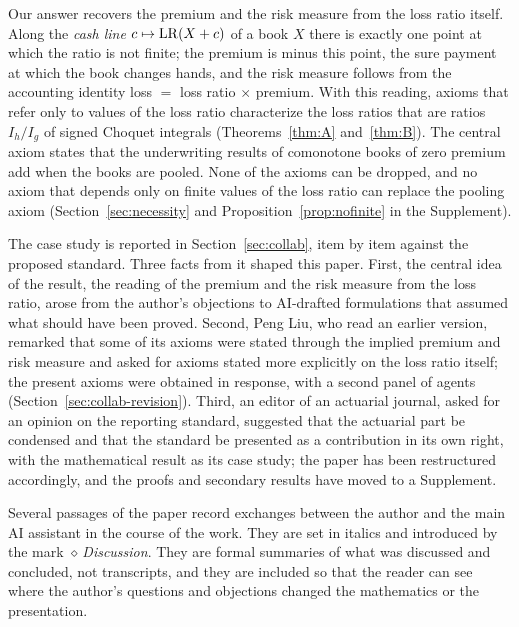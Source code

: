 Our answer recovers the premium and the risk measure from the loss ratio itself. Along the \emph{cash line}
$c\mapsto\mathrm{LR}(X+c)$ of a book $X$ there is exactly one point at which the ratio is not finite; the premium is minus
this point, the sure payment at which the book changes hands, and the risk measure follows from the accounting
identity loss $=$ loss ratio $\times$ premium. With this reading, axioms that refer only to values of the loss ratio
characterize the loss ratios that are ratios $I_h/I_g$ of signed Choquet integrals (Theorems~\ref{thm:A}
and~\ref{thm:B}). The central axiom states that the underwriting results of comonotone books of zero premium add
when the books are pooled. None of the axioms can be dropped, and no axiom that depends only on finite values of the
loss ratio can replace the pooling axiom (Section~\ref{sec:necessity} and Proposition~\ref{prop:nofinite} in the Supplement).

The case study is reported in Section~\ref{sec:collab}, item by item against the proposed standard. Three facts
from it shaped this paper. First, the central idea of the result, the reading of the premium and the risk measure
from the loss ratio, arose from the author's objections to AI-drafted formulations that assumed what should have
been proved. Second, Peng Liu, who read an earlier version, remarked that some of its axioms were stated through the
implied premium and risk measure and asked for axioms stated more explicitly on the loss ratio itself; the present
axioms were obtained in response, with a second panel of agents (Section~\ref{sec:collab-revision}). Third, an
editor of an actuarial journal, asked for an opinion on the reporting standard, suggested that the actuarial part
be condensed and that the standard be presented as a contribution in its own right, with the mathematical result as
its case study; the paper has been restructured accordingly, and the proofs and secondary results have moved to a
Supplement.

Several passages of the paper record exchanges between the author and the main AI assistant in the course of the
work. They are set in italics and introduced by the mark $\diamond$\,\emph{Discussion}. They are formal summaries
of what was discussed and concluded, not transcripts, and they are included so that the reader can see where the
author's questions and objections changed the mathematics or the presentation.

